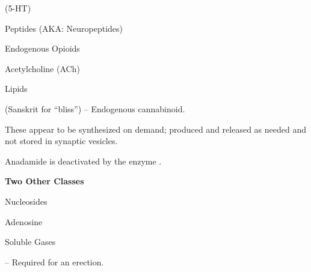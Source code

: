 \begin{coloredlist}
\begin{coloredlist}

        \item {} %
        \begin{coloredlist}
            \item {} (5-HT) %
            \item {} %
        \end{coloredlist}
        \item Peptides (AKA: Neuropeptides)
        \begin{coloredlist}
            \item Endogenous Opioids
        \end{coloredlist}
        \item Acetylcholine (ACh)
        \item Lipids
        \begin{coloredlist}
            \item {} (Sanskrit for ``bliss'') -- Endogenous cannabinoid.
            \item These appear to be synthesized on demand; produced and released as needed and not stored in synaptic vesicles.
            \item Anadamide is deactivated by the enzyme .
        \end{coloredlist}
        \item \textbf{Two Other Classes}
        \begin{coloredlist}
            \item Nucleosides
            \begin{coloredlist}
                \item Adenosine
            \end{coloredlist}
            \item Soluble Gases
            \begin{coloredlist}
                \item {} -- Required for an erection.
            \end{coloredlist}
        \end{coloredlist}
    \end{coloredlist}
\end{coloredlist}

